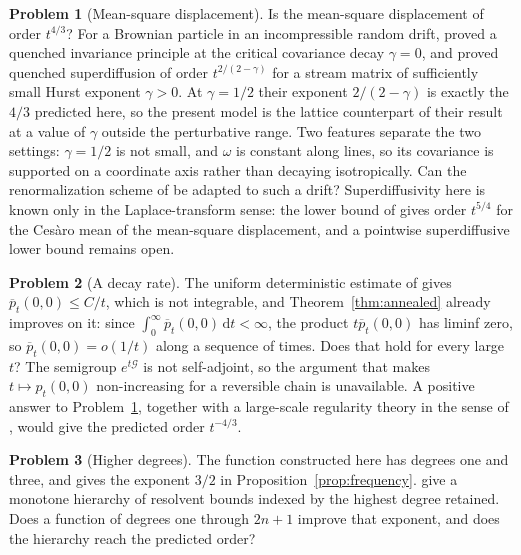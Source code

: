 \documentclass[11pt]{amsart}
\theoremstyle{plain}
\theoremstyle{definition}
\newtheorem{problem}{Problem}
\newcommand{\1}{\mathbf 1}
\newcommand{\dd}{\,\mathrm d}
\begin{document}
\begin{problem}[Mean-square displacement]\label{prob:powerlaw}
Is the mean-square displacement of order $t^{4/3}$?  For a Brownian particle
in an incompressible random drift, \citet*[Theorem~A]{ABK24} proved a
quenched invariance principle at the critical covariance decay $\gamma=0$,
and \citet*[Theorem~A]{ABK26} proved quenched superdiffusion of order
$t^{2/(2-\gamma)}$ for a stream matrix of sufficiently small Hurst exponent
$\gamma>0$.  At $\gamma=1/2$ their exponent $2/(2-\gamma)$ is exactly the
$4/3$ predicted here, so the present model is the lattice counterpart of
their result at a value of $\gamma$ outside the perturbative range.  Two
features separate the two settings: $\gamma=1/2$ is not small, and $\omega$ is
constant along lines, so its covariance is supported on a coordinate axis
rather than decaying isotropically.  Can the renormalization scheme of
\citet*[Sections~1.3 and 3]{ABK26} be adapted to such a drift?
Superdiffusivity here is known only in the Laplace-transform sense: the lower
bound of \citet*[Theorem~1.1 and the discussion following it]{LTV18} gives
order $t^{5/4}$ for the Ces\`aro mean of the mean-square displacement, and a
pointwise superdiffusive lower bound remains open.
\end{problem}

\begin{problem}[A decay rate]\label{prob:pointwise}
The uniform deterministic estimate of
\citet*[Proposition~3 and Lemma~5]{KT17} gives $\overline p_t(0,0)\leq C/t$,
which is not integrable, and Theorem~\ref{thm:annealed} already improves on
it: since $\int_0^\infty\overline p_t(0,0)\dd t<\infty$, the product
$t\overline p_t(0,0)$ has liminf zero, so $\overline p_t(0,0)=o(1/t)$ along a
sequence of times.  Does that hold for every large $t$?  The semigroup
$e^{t\mathcal G}$ is not self-adjoint, so the argument that makes
$t\mapsto p_t(0,0)$ non-increasing for a reversible chain is unavailable.  A
positive answer to Problem~\ref{prob:powerlaw}, together with a large-scale
regularity theory in the sense of \citet*[Chapter~3]{AKM19}, would give the
predicted order $t^{-4/3}$.
\end{problem}

\begin{problem}[Higher degrees]\label{prob:degrees}
The function constructed here has degrees one and three, and gives the
exponent $3/2$ in Proposition~\ref{prop:frequency}.
\citet*[(2.15)]{LQSY04} give a monotone hierarchy of resolvent bounds indexed
by the highest degree retained.  Does a function of degrees one
through $2n+1$ improve that exponent, and does the hierarchy reach the
predicted order?
\end{problem}
\end{document}

